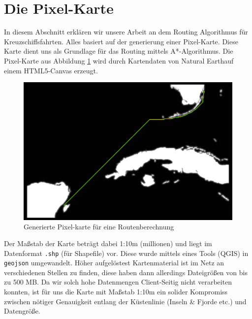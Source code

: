 \documentclass[letterpaper]{article}
\begin{document}
\section{Die Pixel-Karte}
	In diesem Abschnitt erklären wir unsere Arbeit an dem Routing Algorithmus für Kreuzschiffsfahrten. Alles basiert auf der generierung einer Pixel-Karte. Diese Karte dient uns als Grundlage für das Routing mittels A*-Algorithmus. Die Pixel-Karte aus Abbildung \ref{fig:Pixel Map Miami} wird durch Kartendaten von Natural Earth\footnotemark auf einem HTML5-Canvas erzeugt. 


	\begin{figure}[!htbp]
		\centering
		\includegraphics[width=\linewidth]{pixel_map_miami}
		\caption{Generierte Pixel-karte für eine Routenberechnung}
		\label{fig:Pixel Map Miami}
	\end{figure}

	Der Maßstab der Karte beträgt dabei 1:10m (millionen) und liegt im Datenformat \texttt{.shp} (für Shapefile) vor. Diese wurde mittels eines Tools (QGIS) in \texttt{geojson} umgewandelt. Höher aufgelöstest Kartenmaterial ist im Netz an verschiedenen Stellen zu finden\footnotemark, diese haben dann allerdings Dateigrößen von bis zu 500 MB. Da wir solch hohe Datenmengen Client-Seitig nicht verarbeiten konnten, ist für uns die Karte mit Maßstab 1:10m ein solider Kompromiss zwischen nötiger Genauigkeit entlang der Küstenlinie (Inseln \& Fjorde etc.) und Datengröße.

\end{document}
